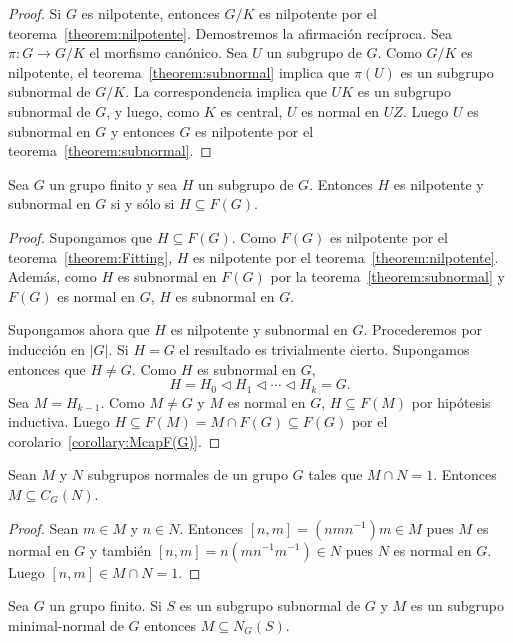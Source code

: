 \begin{proof}
	Si $G$ es nilpotente, entonces $G/K$ es nilpotente por el
	teorema~\ref{theorem:nilpotente}. Demostremos la afirmación recíproca. Sea
	$\pi\colon G\to G/K$ el morfismo canónico. Sea $U$ un subgrupo de $G$. Como
	$G/K$ es nilpotente, el teorema~\ref{theorem:subnormal} implica que
	$\pi(U)$ es un subgrupo subnormal de $G/K$. La correspondencia implica que
	$UK$ es un subgrupo subnormal de $G$, y luego, como $K$ es central, $U$ es
	normal en $UZ$. Luego $U$ es subnormal en $G$ y entonces $G$ es nilpotente
	por el teorema~\ref{theorem:subnormal}.
\end{proof}

\begin{theorem}
	\label{theorem:F(G)subnormalidad}
	Sea $G$ un grupo finito y sea $H$ un subgrupo de $G$. Entonces $H$ es
	nilpotente y subnormal en $G$ si y sólo si $H\subseteq F(G)$.
\end{theorem}

\begin{proof}
	Supongamos que $H\subseteq F(G)$. Como $F(G)$ es nilpotente por el
	teorema~\ref{theorem:Fitting}, $H$ es nilpotente por el
	teorema~\ref{theorem:nilpotente}. Además, como $H$ es subnormal en $F(G)$ por la
	teorema~\ref{theorem:subnormal} y $F(G)$ es normal en $G$, $H$ es
	subnormal en $G$.

	Supongamos ahora que $H$ es nilpotente y subnormal en $G$.  Procederemos
	por inducción en $|G|$. Si $H=G$ el resultado es trivialmente cierto.
	Supongamos entonces que $H\ne G$. Como $H$ es subnormal en $G$, 
	\[
		H=H_0\triangleleft H_1\triangleleft\cdots\triangleleft H_k=G.
	\]
	Sea $M=H_{k-1}$. Como $M\ne G$ y $M$ es normal en $G$, 
	$H\subseteq F(M)$ por hipótesis	inductiva. Luego $H\subseteq F(M)=M\cap
	F(G)\subseteq F(G)$ por el corolario~\ref{corollary:McapF(G)}.
\end{proof}

\begin{lemma}
	\label{lemma:McapN=1}
	Sean $M$ y $N$ subgrupos normales de un grupo $G$ tales que $M\cap N=1$.
	Entonces $M\subseteq C_G(N)$.
\end{lemma}

\begin{proof}
	Sean $m\in M$ y $n\in N$. Entonces $[n,m]=(nmn^{-1})m\in M$ pues $M$ es
	normal en $G$ y también $[n,m]=n(mn^{-1}m^{-1})\in N$ pues $N$ es normal en
	$G$. Luego $[n,m]\in M\cap N=1$.
\end{proof}

\begin{theorem}[Wielandt]
	\label{theorem:MsubsetNG(S)}
	Sea $G$ un grupo finito. Si $S$ es un subgrupo subnormal de $G$ 
	y $M$ es un subgrupo minimal-normal de $G$ entonces $M\subseteq N_G(S)$.
\end{theorem}

